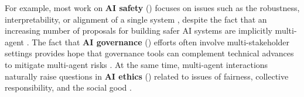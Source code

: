 For example, most work on \textbf{AI safety} () focuses on issues such as the robustness, interpretability, or alignment of a single system \citep{Amodei2016, Hendrycks2021, Anwar2024}, despite the fact that an increasing number of proposals for building safer AI systems are implicitly multi-agent \citep[e.g.,][]{Irving2018,Drexler2019,Greenblatt2023,Schwettmann2023,Perez2022}.
The fact that \textbf{AI governance} () efforts often involve multi-stakeholder settings provides hope that governance tools can complement technical advances to mitigate multi-agent risks \citep{reuel2024open, trager2023international}.
At the same time, multi-agent interactions naturally raise questions in \textbf{AI ethics} () related to issues of fairness, collective responsibility, and the social good \citep{Gabriel2024,NIPS2014_792c7b5a,friedenberg2019blameworthiness}.

